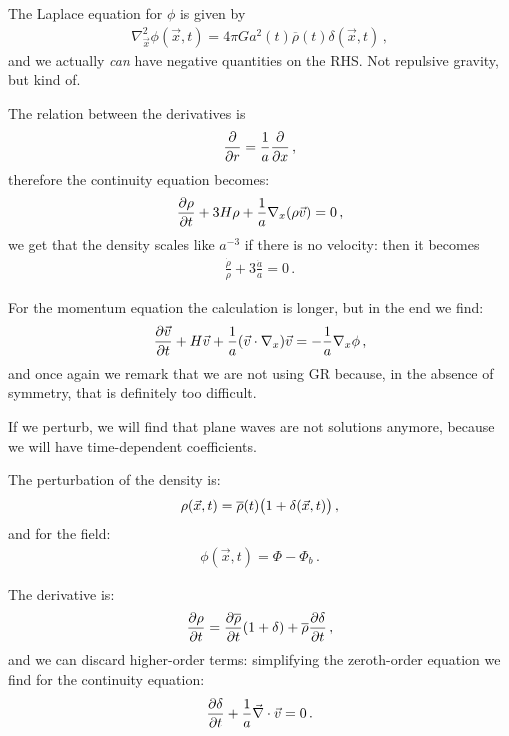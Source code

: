 \documentclass[main.tex]{subfiles}
\begin{document}
The Laplace equation for \(\phi \) is given by 
%
\begin{align}
  \nabla^2_{\vec{x}} \phi (\vec{x}, t) = 4 \pi G a^2(t) \overline{\rho} (t) \delta (\vec{x}, t)
\,,
\end{align}
%
and we actually \emph{can} have negative quantities on the RHS. Not repulsive gravity, but kind of. 

The relation between the derivatives is 
%
\begin{align}
  \pdv{}{r} = \frac{1}{a } \pdv{}{x}
\,,
\end{align}
%
therefore the continuity equation becomes:
%
\begin{align}
  \pdv{\rho }{t} + 3H \rho + \frac{1}{a} \nabla_{x} \qty(\rho \vec{v}) = 0
\,,
\end{align}
%
we get that the density scales like \(a^{-3}\) if there is no velocity: then it becomes 
%
\begin{align}
  \frac{\dot{\rho}}{\rho } + 3 \frac{\dot{a}}{a} =0 
\,.
\end{align}
%

For the momentum equation the calculation is longer, but in the end we find: 
%
\begin{align}
  \pdv{\vec{v}}{t} + H \vec{v} +
  \frac{1}{a} \qty(\vec{v} \cdot \nabla_{x}) \vec{v}
  = - \frac{1}{a} \nabla_{x} \phi 
\,,
\end{align}
%
and once again we remark that we are not using GR because, in the absence of symmetry, that is definitely too difficult. 

If we perturb, we will find that plane waves are not solutions anymore, because we will have time-dependent coefficients. 

The perturbation of the density is: 
%
\begin{align}
  \rho (\vec{x}, t) = \overline{\rho}(t) \qty(1 + \delta (\vec{x}, t))
\,,
\end{align}
%
and for the field: 
%
\begin{align}
  \phi (\vec{x}, t) = \Phi - \Phi_b
\,.
\end{align}

The derivative is: 
%
\begin{align}
  \pdv{\rho }{t} = \pdv{\overline{\rho}}{t} \qty(1 + \delta ) + \overline{\rho} \pdv{ \delta }{t}
\,,
\end{align}
%
and we can discard higher-order terms: simplifying the zeroth-order equation we find for the  continuity equation: 
%
\begin{align}
  \pdv{ \delta }{t} + \frac{1}{a} \vec{\nabla} \cdot \vec{v} = 0
\,.
\end{align}
\end{document}
